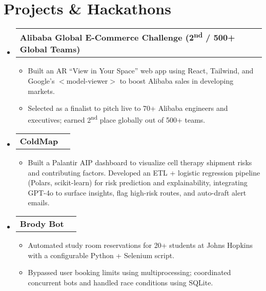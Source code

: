 \documentclass[letterpaper,10pt]{article}
\makeatletter
\newcommand{\resumeItem}[1]{
  \item\small{
    {#1 \vspace{-2pt}}
  }
}
\newcommand{\resumeProjectHeading}[2]{
    \item
    \begin{tabular*}{0.97\textwidth}{l@{\extracolsep{\fill}}r}
      \small#1 & #2 \\
    \end{tabular*}\vspace{-7pt}
}
\newcommand{\resumeSubHeadingListStart}{\begin{itemize}[leftmargin=0.15in, label={}]}
\newcommand{\resumeSubHeadingListEnd}{\end{itemize}}
\newcommand{\resumeItemListStart}{\begin{itemize}}
\newcommand{\resumeItemListEnd}{\end{itemize}\vspace{-5pt}}
\makeatother
\begin{document}
    \section{Projects \& Hackathons}
      \resumeSubHeadingListStart
        \resumeProjectHeading
          {\textbf{Alibaba Global E-Commerce Challenge (2\textsuperscript{nd} / 500+ Global Teams)}}{}
          \resumeItemListStart
            \resumeItem{Built an AR “View in Your Space” web app using React, Tailwind, and Google's $<$model-viewer$>$ to boost Alibaba sales in developing markets.}

            \resumeItem{Selected as a finalist to pitch live to 70+ Alibaba engineers and executives; earned 2\textsuperscript{nd} place globally out of 500+ teams.}
          \resumeItemListEnd
          
        \resumeProjectHeading
          {\textbf{ColdMap}}{}
          \resumeItemListStart
            \resumeItem{Built a Palantir AIP dashboard to visualize cell therapy shipment risks and contributing factors. Developed an ETL + logistic regression pipeline (Polars, scikit-learn) for risk prediction and explainability, integrating GPT-4o to surface insights, flag high-risk routes, and auto-draft alert emails.}

          \resumeItemListEnd

        \resumeProjectHeading
          {\textbf{Brody Bot}}{}
          \resumeItemListStart
            \resumeItem{Automated study room reservations for 20+ students at Johns Hopkins with a configurable Python + Selenium script.}
            \resumeItem{Bypassed user booking limits using multiprocessing; coordinated concurrent bots and handled race conditions using SQLite.}
          \resumeItemListEnd

      \resumeSubHeadingListEnd

\end{document}
